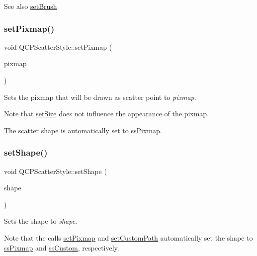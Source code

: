 \begin{DoxySeeAlso}{See also}
\mbox{\hyperlink{class_q_c_p_scatter_style_a74d692aaeb8d4b36d6f7d510e44264b1}{set\+Brush}} 
\end{DoxySeeAlso}
\mbox{\label{class_q_c_p_scatter_style_a5fb611d46acfac520d7b89a1c71d9246}} 
\subsubsection{\texorpdfstring{set\+Pixmap()}{setPixmap()}}
{\footnotesize\ttfamily void Q\+C\+P\+Scatter\+Style\+::set\+Pixmap (\begin{DoxyParamCaption}\item[{const Q\+Pixmap \&}]{pixmap }\end{DoxyParamCaption})}

Sets the pixmap that will be drawn as scatter point to {\itshape pixmap}.

Note that \mbox{\hyperlink{class_q_c_p_scatter_style_aaefdd031052892c4136129db68596e0f}{set\+Size}} does not influence the appearance of the pixmap.

The scatter shape is automatically set to \mbox{\hyperlink{class_q_c_p_scatter_style_adb31525af6b680e6f1b7472e43859349a8718b849ca7c307b07b8e091efb0c31e}{ss\+Pixmap}}. \mbox{\label{class_q_c_p_scatter_style_a7c641c4d4c6d29cb705d3887cfce91c1}} 
\subsubsection{\texorpdfstring{set\+Shape()}{setShape()}}
{\footnotesize\ttfamily void Q\+C\+P\+Scatter\+Style\+::set\+Shape (\begin{DoxyParamCaption}\item[{\mbox{\hyperlink{class_q_c_p_scatter_style_adb31525af6b680e6f1b7472e43859349}{Q\+C\+P\+Scatter\+Style\+::\+Scatter\+Shape}}}]{shape }\end{DoxyParamCaption})}

Sets the shape to {\itshape shape}.

Note that the calls \mbox{\hyperlink{class_q_c_p_scatter_style_a5fb611d46acfac520d7b89a1c71d9246}{set\+Pixmap}} and \mbox{\hyperlink{class_q_c_p_scatter_style_a96a3e949f90b2afe5677ca9412a12a1e}{set\+Custom\+Path}} automatically set the shape to \mbox{\hyperlink{class_q_c_p_scatter_style_adb31525af6b680e6f1b7472e43859349a8718b849ca7c307b07b8e091efb0c31e}{ss\+Pixmap}} and \mbox{\hyperlink{class_q_c_p_scatter_style_adb31525af6b680e6f1b7472e43859349a15d9bcfd9de94edda949006529f9219d}{ss\+Custom}}, respectively.

